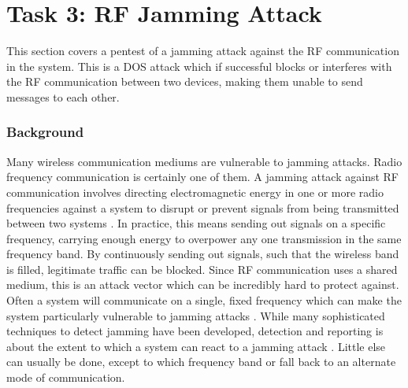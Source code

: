 \section{Task 3: RF Jamming Attack} \label{ch:pentesting:rf-jamming}
This section covers a pentest of a jamming attack against the RF communication in the system. This is a \gls{DOS} attack which if successful blocks or interferes with the RF communication between two devices, making them unable to send messages to each other.

\subsubsection{Background}
Many wireless communication mediums are vulnerable to jamming attacks. Radio frequency communication is certainly one of them. A jamming attack against RF communication involves directing electromagnetic energy in one or more radio frequencies against a system to disrupt or prevent signals from being transmitted between two systems \cite{adamy2004ew}. In practice, this means sending out signals on a specific frequency, carrying enough energy to overpower any one transmission in the same frequency band. By continuously sending out signals, such that the wireless band is filled, legitimate traffic can be blocked. Since RF communication uses a shared medium, this is an attack vector which can be incredibly hard to protect against. Often a system will communicate on a single, fixed frequency which can make the system particularly vulnerable to jamming attacks \cite{jamming-feasibility}. While many sophisticated techniques to detect jamming have been developed, detection and reporting is about the extent to which a system can react to a jamming attack \cite{optimal-jamming-defense}. Little else can usually be done, except to which frequency band or fall back to an alternate mode of communication.

